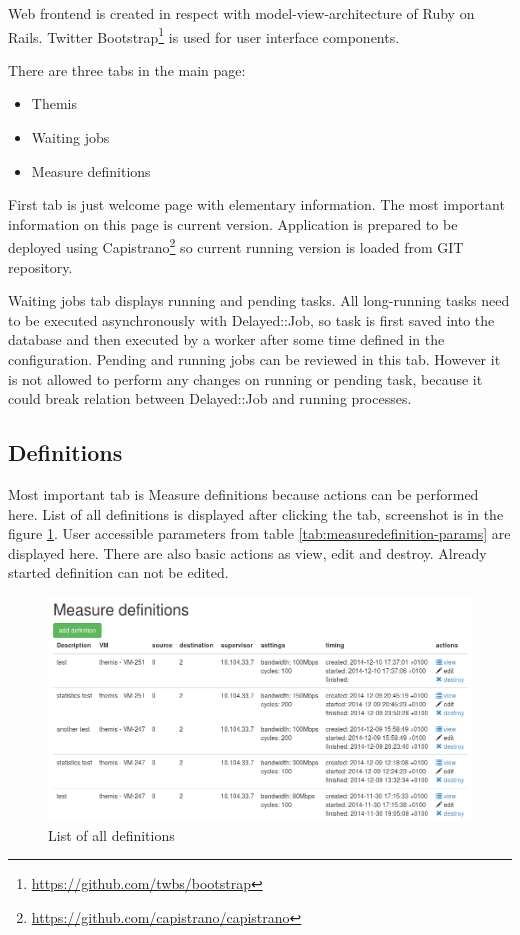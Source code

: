 Web frontend is created in respect with model-view-architecture of Ruby on Rails. Twitter Bootstrap\footnote{\url{https://github.com/twbs/bootstrap}} is used for user interface components.

There are three tabs in the main page:
	\begin{itemize}
		\item Themis
		\item Waiting jobs
		\item Measure definitions
	\end{itemize}

First tab is just welcome page with elementary information. The most important information on this page is current version. Application is prepared to be deployed using Capistrano\footnote{\url{https://github.com/capistrano/capistrano}} so current running version is loaded from GIT repository.

Waiting jobs tab displays running and pending tasks. All long-running tasks need to be executed asynchronously with Delayed::Job, so task is first saved into the database and then executed by a worker after some time defined in the configuration. Pending and running jobs can be reviewed in this tab. However it is not allowed to perform any changes on running or pending task, because it could break relation between Delayed::Job and running processes.

\subsection{Definitions}
Most important tab is Measure definitions because actions can be performed here. List of all definitions is displayed after clicking the tab, screenshot is in the figure \ref{img:themis-definitions}. User accessible parameters from table \ref{tab:measuredefinition-params} are displayed here. There are also basic actions as view, edit and destroy. Already started definition can not be edited.

\begin{figure}[htb]
	\begin{center}
	\includegraphics[width=\textwidth]{themis-definitions.png}
	\end{center}
	\caption{List of all definitions}
	\label{img:themis-definitions}
\end{figure}

